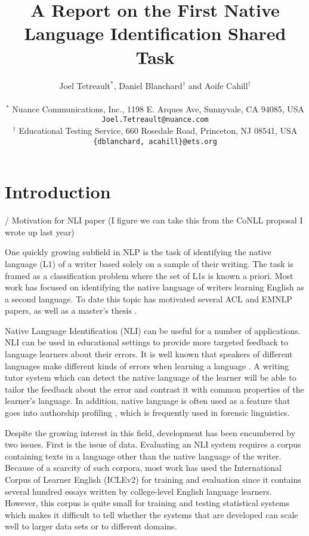 \documentclass[11pt,letterpaper]{article}
\title{A Report on the First Native Language Identification Shared Task}
\author{Joel Tetreault$^{*}$, Daniel Blanchard$^{\dag}$ and Aoife Cahill$^{\dag}$\\
\\
  { $^{*}$ Nuance Communications, Inc., 1198 E. Arques Ave, Sunnyvale, CA 94085, USA}\\
  { {\tt Joel.Tetreault@nuance.com}} \\
  { $^{\dag}$ Educational Testing Service, 660 Rosedale Road, Princeton, NJ 08541, USA}\\
  { {\tt \{dblanchard, acahill\}@ets.org}}\\
}
\date{}
\begin{document}
\maketitle
\begin{abstract}

\end{abstract}

\section{Introduction}
\label{sec-intro}
 / Motivation for NLI paper (I figure we can take this from the CoNLL proposal I wrote up last year)

One quickly growing subfield in NLP is the task of identifying the native
language (L1) of a writer based solely on a sample of their writing. The task
is framed as a classification problem where the set of L1s is known a priori.
Most work has focused on identifying the native language of writers
learning English as a second language. To date this topic has motivated
several ACL and EMNLP papers, as well as a master's thesis \cite{kochmar2011identification}.

Native Language Identification (NLI) can be useful for a number of
applications. NLI can be used in educational settings to provide more
targeted feedback to language learners about their errors. It is
well known that speakers of different languages make different kinds of
errors when learning a language \cite{SwanSmith01}. A writing tutor system
which can detect the native language of the learner will be able to tailor
the feedback about the error and contrast it with common
properties of the learner's language. In addition, native language is
often used as a feature that goes into authorship profiling
\cite{estival2007author}, which is frequently used in forensic linguistics.

Despite the growing interest in this field, development has been encumbered
by two issues. First is the issue of data. Evaluating an NLI system requires
 a corpus containing texts in a language other than the native language of
the writer. Because of a scarcity of such corpora, most work has used
the International Corpus of Learner English (ICLEv2) \cite{Granger2009}
for training and evaluation since it contains several hundred essays
written by college-level English language learners. However,
this corpus is quite small for training and testing statistical systems
which makes it difficult to tell whether the systems that are developed can
scale well to larger data sets or to different domains.
\end{document}
